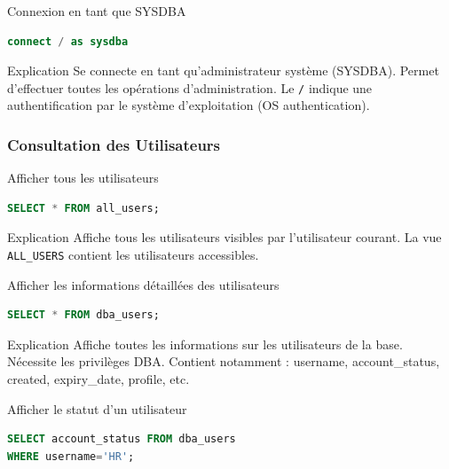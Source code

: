 \documentclass[12pt,a4paper]{article}
\begin{document}
\begin{commande}{Connexion en tant que SYSDBA}
\begin{lstlisting}[language=SQL]
connect / as sysdba
\end{lstlisting}
\end{commande}

\begin{explication}{Explication}
Se connecte en tant qu'administrateur système (SYSDBA). Permet d'effectuer toutes les opérations d'administration. Le \texttt{/} indique une authentification par le système d'exploitation (OS authentication).
\end{explication}

\subsubsection{Consultation des Utilisateurs}

\begin{commande}{Afficher tous les utilisateurs}
\begin{lstlisting}[language=SQL]
SELECT * FROM all_users;
\end{lstlisting}
\end{commande}

\begin{explication}{Explication}
Affiche tous les utilisateurs visibles par l'utilisateur courant. La vue \texttt{ALL\_USERS} contient les utilisateurs accessibles.
\end{explication}

\begin{commande}{Afficher les informations détaillées des utilisateurs}
\begin{lstlisting}[language=SQL]
SELECT * FROM dba_users;
\end{lstlisting}
\end{commande}

\begin{explication}{Explication}
Affiche toutes les informations sur les utilisateurs de la base. Nécessite les privilèges DBA. Contient notamment : username, account\_status, created, expiry\_date, profile, etc.
\end{explication}

\begin{commande}{Afficher le statut d'un utilisateur}
\begin{lstlisting}[language=SQL]
SELECT account_status FROM dba_users 
WHERE username='HR';
\end{lstlisting}
\end{commande}
\end{document}
